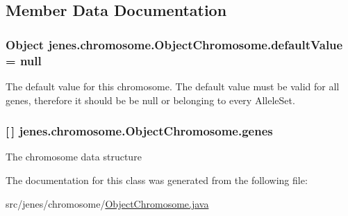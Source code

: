 \subsection{Member Data Documentation}
\hypertarget{classjenes_1_1chromosome_1_1_object_chromosome_af5e2ac0b5272d948ec566f824baa3411}{
\subsubsection[{default\-Value}]{\setlength{\rightskip}{0pt plus 5cm}Object jenes.\-chromosome.\-Object\-Chromosome.\-default\-Value = null\hspace{0.3cm}{\ttfamily [protected]}}}\label{classjenes_1_1chromosome_1_1_object_chromosome_af5e2ac0b5272d948ec566f824baa3411}
The default value for this chromosome. The default value must be valid for all genes, therefore it should be be {\ttfamily null} or belonging to every {\ttfamily Allele\-Set}. \hypertarget{classjenes_1_1chromosome_1_1_object_chromosome_a33bb9e1cc526fe8e4be0417bbd05a127}{
\subsubsection[{genes}]{ \mbox{[}$\,$\mbox{]} jenes.\-chromosome.\-Object\-Chromosome.\-genes\hspace{0.3cm}{\ttfamily [protected]}}}\label{classjenes_1_1chromosome_1_1_object_chromosome_a33bb9e1cc526fe8e4be0417bbd05a127}
The chromosome data structure 

The documentation for this class was generated from the following file\-:\begin{DoxyCompactItemize}
\item 
src/jenes/chromosome/\hyperlink{_object_chromosome_8java}{Object\-Chromosome.\-java}\end{DoxyCompactItemize}
